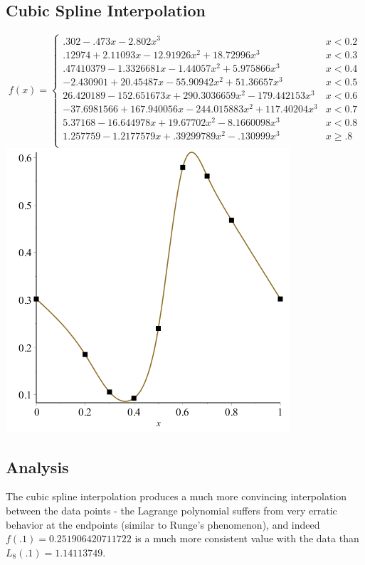 \documentclass[11pt]{article} %
\begin{document}
\subsection*{Cubic Spline Interpolation}
$$
f(x) = \left\{
        \begin{array}{ll}
            .302 - .473x - 2.802x^3 &  x < 0.2 \\
            .12974+2.11093x-12.91926x^2+18.72996x^3 & x < 0.3 \\
 	.47410379-1.3326681x-1.44057x^2+5.975866x^3 & x < 0.4 \\
 	-2.430901+20.45487x-55.90942x^2+51.36657x^3 &  x < 0.5 \\
 	26.420189-152.651673x+290.3036659x^2-179.442153x^3 &  x < 0.6 \\
 	-37.6981566+167.940056x-244.015883x^2+117.40204x^3 & x < 0.7 \\
 	5.37168-16.644978x+19.67702x^2-8.1660098x^3 & x < 0.8 \\
 	1.257759-1.2177579x+.39299789x^2-.130999x^3 &  x \geq .8 \\
        \end{array}
    \right.
$$
\includegraphics[scale=.5]{plots/problem7plot2.png}

\subsection*{Analysis}
The cubic spline interpolation produces a much more convincing interpolation between the data points - the Lagrange polynomial suffers from very erratic behavior
at the endpoints (similar to Runge's phenomenon), and indeed $f(.1) = 0.251906420711722$ is a much more consistent value with the data than $L_8(.1) = 1.14113749$. 
\end{document}
